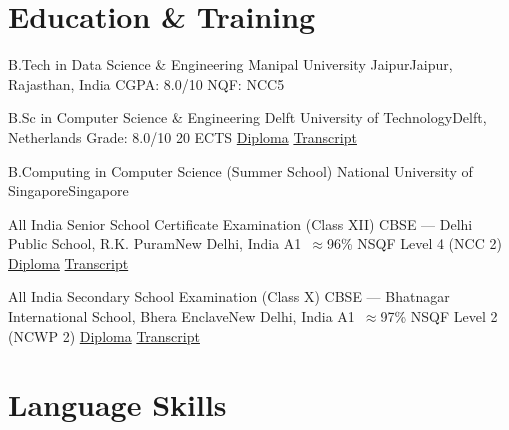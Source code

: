 \documentclass[11pt,a4paper]{moderncv}
\begin{document}


\section{Education \& Training}

%
  {B.Tech in Data Science \& Engineering}%
  {Manipal University Jaipur}{Jaipur, Rajasthan, India}%
  {CGPA: 8.0/10 \textbar{} NQF: NCC5}{}

%
  {B.Sc in Computer Science \& Engineering}%
  {Delft University of Technology}{Delft, Netherlands}%
  {Grade: 8.0/10 \textbar{} 20 ECTS}%
  {\href{https://europa.eu/!yp79Jh}{Diploma} \textbar{} \href{https://europa.eu/!BB98Ww}{Transcript}}

%
  {B.Computing in Computer Science (Summer School)}%
  {National University of Singapore}{Singapore}{}{}

%
  {All India Senior School Certificate Examination (Class XII)}%
  {CBSE --- Delhi Public School, R.K. Puram}{New Delhi, India}%
  {A1~$\approx$96\% \textbar{} NSQF Level 4 (NCC 2)}%
  {\href{https://europa.eu/!yp79Jh}{Diploma} \textbar{} \href{https://europa.eu/!BB98Ww}{Transcript}}

%
  {All India Secondary School Examination (Class X)}%
  {CBSE --- Bhatnagar International School, Bhera Enclave}{New Delhi, India}%
  {A1~$\approx$97\% \textbar{} NSQF Level 2 (NCWP 2)}%
  {\href{https://europa.eu/!Mv98jr}{Diploma} \textbar{} \href{https://europa.eu/!uG83GN}{Transcript}}

\section{Language Skills}



\end{document}
